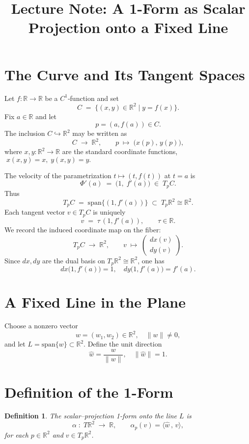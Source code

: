 \documentclass[12pt]{article}
\title{Lecture Note: A 1-Form as Scalar Projection onto a Fixed Line}
\author{}
\date{}
\theoremstyle{definitionstyle}
\newtheorem{definition}{Definition} %
\newcommand{\R}{\mathbb{R}}
\renewcommand{\span}{\mathrm{span}}
\begin{document}
	\maketitle
	
	\section{The Curve and Its Tangent Spaces}
	Let \(f\colon\mathbb{R}\to\mathbb{R}\) be a \(C^1\)‐function and set
	\[
	C \;=\;\bigl\{(x,y)\in\mathbb{R}^2\mid y=f(x)\bigr\}.
	\]
	Fix \(a\in\mathbb{R}\) and let
	\[
	p=(a,f(a))\in C.
	\]
	The inclusion \(C\hookrightarrow\mathbb{R}^2\) may be written as
	\[
	C\;\longrightarrow\;\mathbb{R}^2,
	\qquad
	p\;\mapsto\;\bigl(x(p),\,y(p)\bigr),
	\]
	where \(x,y\colon\mathbb{R}^2\to\mathbb{R}\) are the standard coordinate functions,
	\(\;x(x,y)=x,\;y(x,y)=y.\)
	
	The velocity of the parametrization \(t\mapsto(t,f(t))\) at \(t=a\) is
	\[
	\Phi'(a) \;=\;\bigl(1,\;f'(a)\bigr)\;\in\;T_pC.
	\]
	Thus
	\[
	T_pC \;=\;\span\bigl\{(1,f'(a))\bigr\}
	\;\subset\;T_p\mathbb{R}^2\cong\mathbb{R}^2.
	\]
	Each tangent vector \(v\in T_pC\) is uniquely
	\[
	v \;=\;\tau\,(1,f'(a)),
	\qquad
	\tau\in\mathbb{R}.
	\]
	We record the induced coordinate map on the fiber:
	\[
	T_pC\;\longrightarrow\;\mathbb{R}^2,\qquad
	v\;\mapsto\;\begin{pmatrix}
		dx(v)\\[6pt]
		dy(v)
	\end{pmatrix}.
	\]
	Since \(dx,dy\) are the dual basis on \(T_p\R^2\cong\R^2\), one has
	\[
	dx\bigl(1,f'(a)\bigr)=1,
	\quad
	dy\bigl(1,f'(a)\bigr)=f'(a).
	\]
	
	\section{A Fixed Line in the Plane}
	Choose a nonzero vector
	\[
	w=(w_1,w_2)\in\mathbb{R}^2,
	\quad
	\|w\|\neq0,
	\]
	and let \(L=\span\{w\}\subset\R^2\).  Define the unit direction
	\[
	\hat w=\frac{w}{\|w\|},
	\quad
	\|\hat w\|=1.
	\]
	
	\section{Definition of the 1-Form}
	\begin{definition}
		The \emph{scalar–projection 1-form} onto the line \(L\) is
		\[
		\alpha\;\colon\;T\R^2\;\longrightarrow\;\R,
		\qquad
		\alpha_p(v)=\bigl\langle\hat w\,,\,v\bigr\rangle,
		\]
		for each \(p\in\R^2\) and \(v\in T_p\R^2\).
	\end{definition}
	
\end{document}
